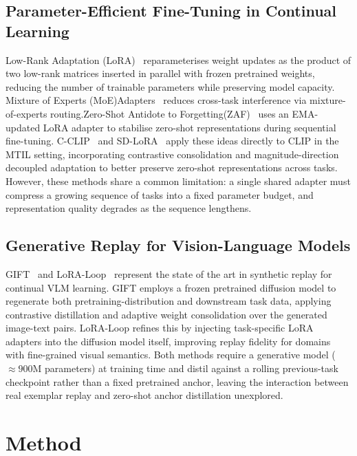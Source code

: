 \documentclass{article}
\begin{document}
  \subsection{Parameter-Efficient Fine-Tuning in Continual Learning}
  Low-Rank Adaptation (LoRA)~\cite{hu2022lora} reparameterises weight updates as
  the product of two low-rank matrices inserted in parallel with frozen pretrained
  weights, reducing the number of trainable parameters while preserving model
  capacity. Mixture of Experts (MoE)Adapters~\cite{yu2024moe} reduces cross-task interference via
  mixture-of-experts routing.Zero-Shot Antidote to Forgetting(ZAF)~\cite{gao2024zaf} uses an EMA-updated LoRA
  adapter to stabilise zero-shot representations during sequential fine-tuning.
  C-CLIP~\cite{liu2025cclip} and SD-LoRA~\cite{wu2025sdlora} apply these ideas
  directly to CLIP in the MTIL setting, incorporating contrastive consolidation and
  magnitude-direction decoupled adaptation to better preserve zero-shot
  representations across tasks. However, these methods share a common limitation:
  a single shared adapter must compress a growing sequence of tasks into a fixed
  parameter budget, and representation quality degrades as the sequence lengthens.

  \subsection{Generative Replay for Vision-Language Models}
  GIFT~\cite{gift2025} and LoRA-Loop~\cite{loraloop2025} represent the state of
  the art in synthetic replay for continual VLM learning. GIFT employs a frozen
  pretrained diffusion model to regenerate both pretraining-distribution and
  downstream task data, applying contrastive distillation and adaptive weight
  consolidation over the generated image-text pairs. LoRA-Loop refines this by
  injecting task-specific LoRA adapters into the diffusion model itself, improving
  replay fidelity for domains with fine-grained visual semantics. Both methods
  require a generative model (${\approx}900$M parameters) at training time and
  distil against a rolling previous-task checkpoint rather than a fixed pretrained
  anchor, leaving the interaction between real exemplar replay and zero-shot anchor
  distillation unexplored.

  \section{Method}
\end{document}
